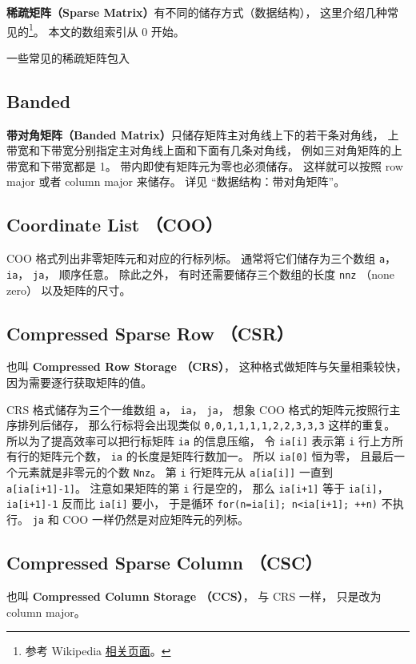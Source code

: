 
\textbf{稀疏矩阵（Sparse Matrix）}有不同的储存方式（数据结构）， 这里介绍几种常见的\footnote{参考 Wikipedia \href{https://en.wikipedia.org/wiki/Sparse_matrix}{相关页面}。}。 本文的数组索引从 0 开始。

一些常见的稀疏矩阵包入 \ve

\subsection{Banded}
\textbf{带对角矩阵（Banded Matrix）}只储存矩阵主对角线上下的若干条对角线， 上带宽和下带宽分别指定主对角线上面和下面有几条对角线， 例如三对角矩阵的上带宽和下带宽都是 1。 带内即使有矩阵元为零也必须储存。 这样就可以按照 row major 或者 column major 来储存。 详见 “数据结构：带对角矩阵”。

\subsection{Coordinate List （COO）}
COO 格式列出非零矩阵元和对应的行标列标。 通常将它们储存为三个数组 \verb|a|， \verb|ia|， \verb|ja|， 顺序任意。 除此之外， 有时还需要储存三个数组的长度 \verb|nnz| （none zero） 以及矩阵的尺寸。

\subsection{Compressed Sparse Row （CSR）}\label{sub_SprMat_3}
也叫 \textbf{Compressed Row Storage （CRS）}， 这种格式做矩阵与矢量相乘较快，因为需要逐行获取矩阵的值。

CRS 格式储存为三个一维数组 \verb|a|， \verb|ia|， \verb|ja|， 想象 COO 格式的矩阵元按照行主序排列后储存， 那么行标将会出现类似 \verb|0,0,1,1,1,1,2,2,3,3,3| 这样的重复。 所以为了提高效率可以把行标矩阵 \verb|ia| 的信息压缩， 令 \verb|ia[i]| 表示第 \verb|i| 行上方所有行的矩阵元个数， \verb|ia| 的长度是矩阵行数加一。 所以 \verb|ia[0]| 恒为零， 且最后一个元素就是非零元的个数 \verb|Nnz|。 第 \verb|i| 行矩阵元从 \verb|a[ia[i]]| 一直到 \verb|a[ia[i+1]-1]|。 注意如果矩阵的第 \verb|i| 行是空的， 那么 \verb|ia[i+1]| 等于 \verb|ia[i]|， \verb|ia[i+1]-1| 反而比 \verb|ia[i]| 要小， 于是循环 \verb|for(n=ia[i]; n<ia[i+1]; ++n)| 不执行。 \verb|ja| 和 COO 一样仍然是对应矩阵元的列标。

\subsection{Compressed Sparse Column （CSC）}
也叫 \textbf{Compressed Column Storage （CCS）}， 与 CRS 一样， 只是改为 column major。
